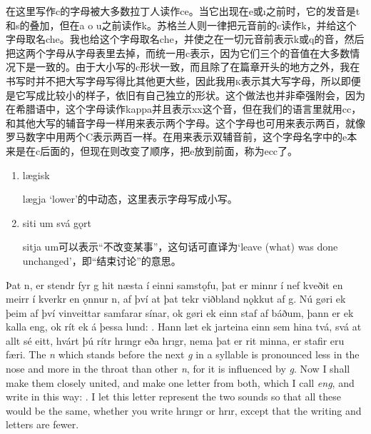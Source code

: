 \begin{translation*}{}
    在这里写作c的字母被大多数拉丁人读作ce。当它出现在e或ı之前时，它的发音是t和s的叠加，但在a o u之前读作k。苏格兰人则一律把元音前的c读作k，并给这个字母取名che。我也给这个字母取名che，并使之在一切元音前表示k或q的音，然后把这两个字母从字母表里去掉，而统一用c表示，因为它们三个的音值在大多数情况下是一致的。由于大小写的c形状一致，而且除了在篇章开头的地方之外，我在书写时并不把大写字母写得比其他更大些，因此我用\textsc{k}表示其大写字母，所以即便是它写成比较小的样子，依旧有自己独立的形状。这个做法也并非牵强附会，因为在希腊语中，这个字母读作kappa并且表示xx这个音，但在我们的语言里就用cc，和其他大写的辅音字母一样用来表示两个字母。这个字母也可用来表示两百，就像罗马数字中用两个C表示两百一样。在用来表示双辅音前，这个字母名字中的e本来是在c后面的，但现在则改变了顺序，把e放到前面，称为ecc了。
\end{translation*}
\begin{grammar*}{}
    \begin{enumerate}[leftmargin=*]
        \item lægisk

              lægja `lower'的中动态，这里表示字母写成小写。

        \item siti um svá gǫrt

              sitja um可以表示“不改变某事”，这句话可直译为`leave (what) was done unchanged'，即“结束讨论”的意思。
    \end{enumerate}
\end{grammar*}
\begin{paracol}{2}
    Þat n, er stendr fyr g hit næsta í einni samstǫfu, þat er minnr í nef kveðit en meirr í kverkr en ǫnnur n, af því at þat tekr viðbland nǫkkut af g. Nú gøri ek þeim af því vinveittar samfarar sínar, ok gøri ek einn staf af báðum, þann er ek kalla eng, ok rít ek á þessa lund: \textcrg . Hann læt ek jarteina einn sem hina tvá, svá at allt sé eitt, hvárt þú rítr hrıngr eða hrıgr, nema þat er rit minna, er stafir eru færi.
    \switchcolumn
    The \textit{n} which stands before the next \textit{g} in a syllable is pronounced less in the nose and more in the throat than other \textit{n}, for it is influenced by \textit{g}. Now I shall make them closely united, and make one letter from both, which I call \textit{eng}, and write in this way: \textcrg . I let this letter represent the two sounds so that all these would be the same, whether you write hrıngr or hrı\textcrg r, except that the writing and letters are fewer.
\end{paracol}
